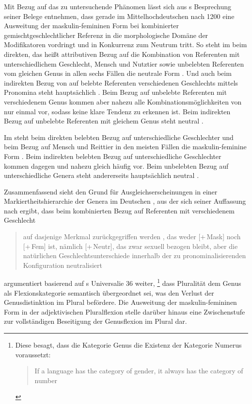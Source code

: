 Mit Bezug auf das zu untersuchende Phänomen lässt sich aus
\citeauthor{askedal1973}s Besprechung seiner Belege entnehmen, dass gerade im
Mittelhochdeutschen nach 1200
eine Ausweitung der maskulin-femininen Form bei kombinierter
gemischt\-geschlechtlicher Referenz in die morphologische Domäne der
Modifikatoren vordringt und in Konkurrenz zum Neutrum tritt. So steht im
 beim direkten, das heißt attributiven Bezug auf die Kombination
von Referenten mit unterschiedlichem Geschlecht, Mensch und Nutztier sowie
unbelebten Referenten vom gleichen Genus in allen sechs Fällen die neutrale
Form .
Und auch beim indirekten Bezug von  auf belebte Referenten
verschiedenen Geschlechts mittels Pronomina steht hauptsächlich . Beim Bezug auf unbelebte Referenten mit verschiedenem Genus kommen
aber nahezu alle Kombinationsmöglichkeiten von 
nur einmal vor, sodass keine klare Tendenz zu erkennen ist. Beim indirekten
Bezug auf unbelebte Referenten mit gleichem Genus steht neutral  \autocites[145--148, 158--161]{askedal1973}[nach][]{lachmannhartl1952}.

Im  steht beim direkten belebten Bezug auf unterschiedliche
Geschlechter und beim Bezug auf Mensch und Reittier in den meisten Fällen die
maskulin-feminine Form .
Beim indirekten belebten Bezug auf unterschiedliche Geschlechter kommen dagegen
 und  nahezu gleich häufig vor. Beim unbelebten
Bezug auf unterschiedliche Genera steht andererseits hauptsächlich neutral
 \autocites[95--99,
126--128]{askedal1973}[nach][]{maroldschroeder1969}.

Zusammenfassend sieht \citeauthor{askedal1973} den Grund für
Ausgleichserscheinungen in einer Markiertheitshierarchie der Genera im
Deutschen \autocite[241--247]{askedal1973}, aus der sich seiner Auffassung nach
ergibt, dass beim kombinierten Bezug auf Referenten mit verschiedenem
Geschlecht \blockcquote[253]{askedal1973}{auf dasjenige Merkmal zurückgegriffen
werden , das weder [+\,Mask] noch [+\,Fem] ist, nämlich
[+\,Neutr], das zwar sexuell bezogen bleibt, aber die natürlichen
Geschlechts\-unterschiede innerhalb der zu pronominalisierenden Konfiguration
neutralisiert}. \citet[173--177]{askedal1973} argumentiert basierend auf
\citeauthor{greenberg1966}s Universalie 36 weiter,%
%
	\footnote{Diese besagt, dass die Kategorie Genus die Existenz der Kategorie
		Numerus voraussetzt:
		\foreignblockcquote{english}[112]{greenberg1966}{If a language has
		the category of gender, it always has the category of number}.%
	}
%
dass Pluralität dem Genus als Flexionskategorie semantisch übergeordnet sei,
was den Verlust der Genusdistinktion im Plural befördere. Die Ausweitung der
maskulin-femininen Form in der adjektivischen Plural\-flexion stelle darüber
hinaus eine Zwischenstufe zur vollständigen Beseitigung der Genusflexion im
Plural dar.

